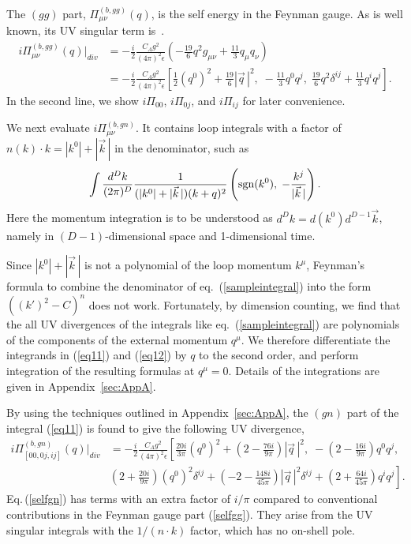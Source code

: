 \documentclass[preprint,amsmath,amssymb,superscriptaddress, floatfix,nofootinbib]{revtex4}
\begin{document}
The $(gg)$ part, $\Pi^{(b, gg)}_{\mu\nu}(q)$, is 
the self energy in the Feynman gauge. As is well known, its 
UV singular term is~\cite{Srednicki:2007qs}. 
%
\begin{align}
i\Pi_{\mu\nu}^{(b, gg)}(q)|_{div}  &= -\frac{i}{2}\frac{C_A g^2}{(4\pi)^2\epsilon}
\left( -\frac{19}{6}q^2g_{\mu\nu} + \frac{11}{3}q_{\mu}q_{\nu} \right) 
\nonumber \\
%
&= -\frac{i}{2}\frac{C_A g^2}{(4\pi)^2\epsilon} 
\left[ \frac{1}{2}(q^0)^2+\frac{19}{6}|\vec{q}\,|^2 , \;  
-\frac{11}{3}q^0{q}^j , \;  
\frac{19}{6}q^2\delta^{ij}+\frac{11}{3}q^i q^j  \right] . 
\label{selfgg}
\end{align}
In the second line, we show 
$i\Pi_{00}$, $i\Pi_{0j}$, and $i\Pi_{ij}$ for later convenience. 

%
We next evaluate $i\Pi_{\mu\nu}^{(b,gn)}$. It contains 
loop integrals with a factor of $n(k)\cdot k=|k^0|+|\vec{k}\,|$ 
in the denominator, such as 
%
\begin{equation}
\int \frac{d^D k}{(2\pi)^D} \frac{ 1 }{ 
(|k^0|+|\vec{k}\,|) (k+q)^2 }
\left( {\rm sgn}(k^0), \; -\frac{{k}^j}{|\vec{k}\,|} \right) . 
\label{sampleintegral}
\end{equation}
%
Here the momentum integration is to be understood 
as $d^D k=d(k^0)d^{D-1}\vec{k}$, 
namely in $(D-1)$-dimensional space and 1-dimensional time. 

Since $|k^0|+|\vec{k}\,|$ is not a polynomial of 
the loop momentum $k^{\mu}$, Feynman's formula to combine 
the denominator of eq.~(\ref{sampleintegral}) into the form 
$((k')^2-C)^n$ does not work. Fortunately, by dimension counting, 
we find that the all UV divergences of 
the integrals like eq.~(\ref{sampleintegral}) are 
polynomials of the components 
of the external momentum $q^{\mu}$. 
We therefore differentiate the integrands in (\ref{eq11}) and (\ref{eq12}) by $q$ to the second 
order, and perform integration of the resulting formulas at 
$q^{\mu}=0$. Details of the integrations are given in Appendix~\ref{sec:AppA}. 

By using the techniques outlined in Appendix~\ref{sec:AppA}, 
the $(gn)$ part of the integral (\ref{eq11}) is found to give 
the following UV divergence, 
%
\begin{align}
i\Pi_{[00, 0j, ij]}^{(b,gn)}(q)|_{div} & 
= -\frac{i}{2}\frac{C_A g^2}{(4 \pi)^2 \epsilon } 
\left[ 
\frac{20i}{3\pi}(q^0)^2+\left( 2-\frac{76i}{9\pi} \right) |\vec{q}\,|^2 , \;  
-\left( 2-\frac{16i}{9\pi} \right) q^0{q}^j , \right.  
\nonumber \\
& \left. \left( 2+\frac{20i}{9\pi} \right) (q^0)^2\delta^{ij} + 
\left( -2-\frac{148i}{45\pi} \right) |\vec{q}\,|^2\delta^{ij}
+\left( 2+\frac{64i}{45\pi} \right) {q}^i{q}^j  \right] .
\label{selfgn} 
\end{align}
%
Eq.\,(\ref{selfgn}) has terms with an extra factor of $i/\pi$ 
compared to conventional contributions in the Feynman gauge part (\ref{selfgg}). 
They arise from the UV singular integrals with the $1/(n\cdot k)$ factor, 
which has no on-shell pole. 
\end{document}
